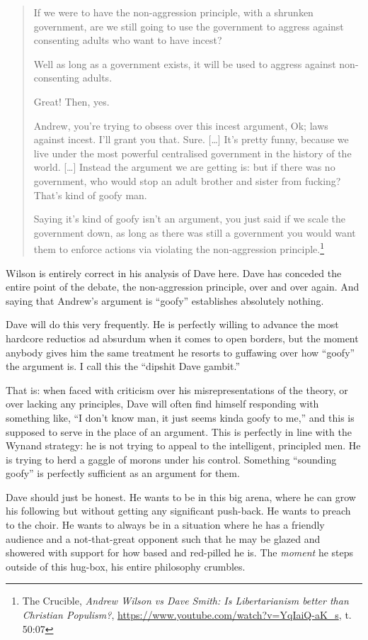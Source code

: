 \documentclass[11pt]{article}
\begin{document}
\begin{quote}
If we were to have the non-aggression principle, with a shrunken government, are we still going to use the government to aggress against consenting adults who want to have incest?

Well as long as a government exists, it will be used to aggress against non-consenting adults.

Great! Then, yes.

Andrew, you're trying to obsess over this incest argument, Ok; laws against incest. I'll grant you that. Sure. [\ldots{}] It's pretty funny, because we live under the most powerful centralised government in the history of the world. [\ldots{}] Instead the argument we are getting is: but if there was no government, who would stop an adult brother and sister from fucking? That's kind of goofy man.

Saying it's kind of goofy isn't an argument, you just said if we scale the government down, as long as there was still a government you would want them to enforce actions via violating the non-aggression principle.\footnote{The Crucible, \emph{Andrew Wilson vs Dave Smith: Is Libertarianism better than Christian Populism?}, \url{https://www.youtube.com/watch?v=YqIaiQ-aK\_s}, t. 50:07}
\end{quote}

Wilson is entirely correct in his analysis of Dave here. Dave has conceded the entire point of the debate, the non-aggression principle, over and over again. And saying that Andrew's argument is ``goofy'' establishes absolutely nothing.

Dave will do this very frequently. He is perfectly willing to advance the most hardcore reductios ad absurdum when it comes to open borders, but the moment anybody gives him the same treatment he resorts to guffawing over how ``goofy'' the argument is. I call this the ``dipshit Dave gambit.''

That is: when faced with criticism over his misrepresentations of the theory, or over lacking any principles, Dave will often find himself responding with something like, ``I don't know man, it just seems kinda goofy to me,'' and this is supposed to serve in the place of an argument. This is perfectly in line with the Wynand strategy: he is not trying to appeal to the intelligent, principled men. He is trying to herd a gaggle of morons under his control. Something ``sounding goofy'' is perfectly sufficient as an argument for them.

Dave should just be honest. He wants to be in this big arena, where he can grow his following but without getting any significant push-back. He wants to preach to the choir. He wants to always be in a situation where he has a friendly audience and a not-that-great opponent such that he may be glazed and showered with support for how based and red-pilled he is. The \emph{moment} he steps outside of this hug-box, his entire philosophy crumbles.
\end{document}
